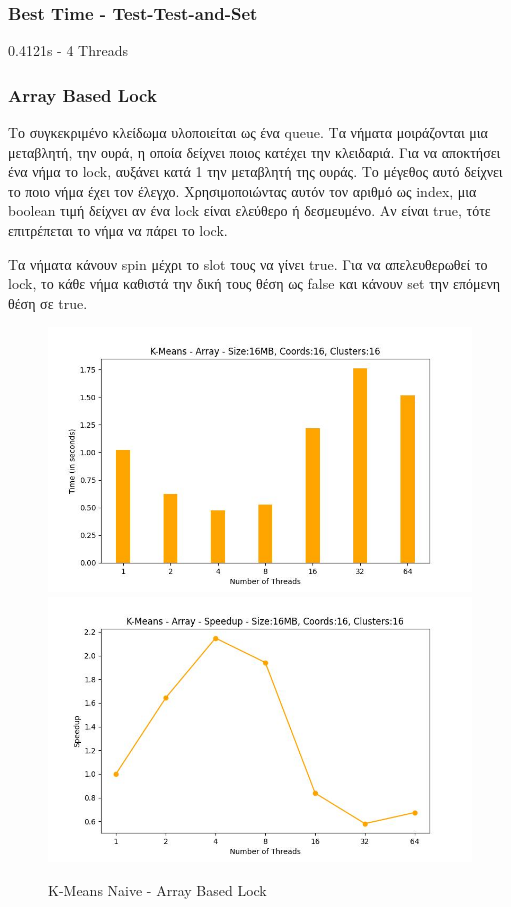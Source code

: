 \documentclass[../final_report.tex]{subfiles}
\begin{document}
\subsubsection*{Best Time - Test-Test-and-Set}
0.4121s - 4 Threads

\subsubsection{Array Based Lock}

Το συγκεκριμένο κλείδωμα υλοποιείται ως ένα queue. Τα νήματα μοιράζονται μια μεταβλητή, την ουρά,
η οποία δείχνει ποιος κατέχει την κλειδαριά. Για να αποκτήσει ένα νήμα το lock, αυξάνει κατά 1 την 
μεταβλητή της ουράς. Το μέγεθος αυτό δείχνει το ποιο νήμα έχει τον έλεγχο. Χρησιμοποιώντας αυτόν τον
αριθμό ως index, μια boolean τιμή δείχνει αν ένα lock είναι ελεύθερο ή δεσμευμένο. Αν είναι true, τότε επιτρέπεται
το νήμα να πάρει το lock.

Τα νήματα κάνουν spin μέχρι το slot τους να γίνει true. Για να απελευθερωθεί το lock, το κάθε νήμα
καθιστά την δική τους θέση ως false και κάνουν set την επόμενη θέση σε true.

\begin{figure}[H]
    \centering
        \includegraphics[scale=0.4]{outFilesCores/plots/kmeans_locks_array.jpg}
        \includegraphics[scale=0.4]{outFilesCores/plots/kmeans_locks_array_speedup.jpg}
    \caption{K-Means Naive - Array Based Lock}
    \label{fig:K-Means Naive - Array Based Lock}
\end{figure}
\end{document}
